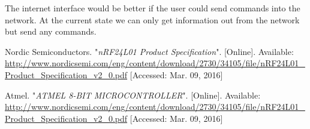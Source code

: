 \documentclass[a4paper,11pt]{article}
\begin{document}
The internet interface would be better if the user could send commands
into the network. At the current state we can only get information out
from the network but send any commands.

\begin{thebibliography}{2}

  Nordic Semiconductors. "\emph{nRF24L01 Product Specification}". [Online]. Available: \url{http://www.nordicsemi.com/eng/content/download/2730/34105/file/nRF24L01_Product_Specification_v2_0.pdf} [Accessed: Mar. 09, 2016]

  Atmel. "\emph{ATMEL 8-BIT MICROCONTROLLER}". [Online]. Available: \url{http://www.nordicsemi.com/eng/content/download/2730/34105/file/nRF24L01_Product_Specification_v2_0.pdf} [Accessed: Mar. 09, 2016]

\end{thebibliography}
\end{document}

